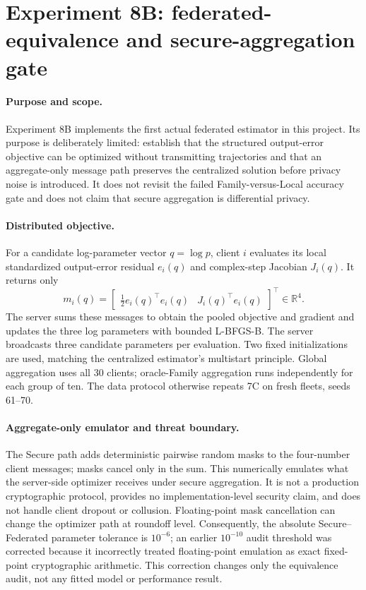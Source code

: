 \section{Experiment 8B: federated-equivalence and secure-aggregation gate}
\label{sec:experiment8b}

\paragraph{Purpose and scope.}
Experiment 8B implements the first actual federated estimator in this project.
Its purpose is deliberately limited: establish that the structured output-error
objective can be optimized without transmitting trajectories and that an
aggregate-only message path preserves the centralized solution before privacy
noise is introduced. It does not revisit the failed Family-versus-Local accuracy
gate and does not claim that secure aggregation is differential privacy.

\paragraph{Distributed objective.}
For a candidate log-parameter vector $q=\log p$, client $i$ evaluates its local
standardized output-error residual $e_i(q)$ and complex-step Jacobian $J_i(q)$.
It returns only
\begin{equation}
 m_i(q)=\begin{bmatrix}\tfrac12 e_i(q)^\top e_i(q) &
 J_i(q)^\top e_i(q)\end{bmatrix}^\top\in\mathbb R^4.
\end{equation}
The server sums these messages to obtain the pooled objective and gradient and
updates the three log parameters with bounded L-BFGS-B. The server broadcasts
three candidate parameters per evaluation. Two fixed initializations are used,
matching the centralized estimator's multistart principle. Global aggregation
uses all 30 clients; oracle-Family aggregation runs independently for each group
of ten. The data protocol otherwise repeats 7C on fresh fleets, seeds 61--70.

\paragraph{Aggregate-only emulator and threat boundary.}
The Secure path adds deterministic pairwise random masks to the four-number
client messages; masks cancel only in the sum. This numerically emulates what the
server-side optimizer receives under secure aggregation. It is not a production
cryptographic protocol, provides no implementation-level security claim, and
does not handle client dropout or collusion. Floating-point mask cancellation
can change the optimizer path at roundoff level. Consequently, the absolute
Secure--Federated parameter tolerance is $10^{-6}$; an earlier $10^{-10}$ audit
threshold was corrected because it incorrectly treated floating-point emulation
as exact fixed-point cryptographic arithmetic. This correction changes only the
equivalence audit, not any fitted model or performance result.

